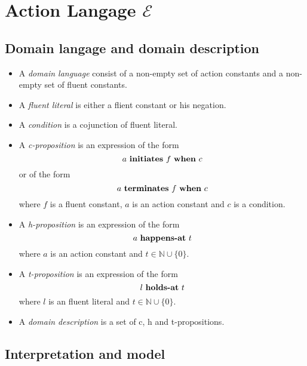 \section{Action Langage $\mathcal{E}$}\label{sec:e}

\theoremstyle{definition}
\newtheorem{definition}{Definition}[section]

\subsection{Domain langage and domain description}

\begin{itemize}
  \item A \emph{domain language} consist of a non-empty set of action constants and a non-empty set of fluent constants.
  \item A \emph{fluent literal} is either a flient constant or his negation.
  \item A \emph{condition} is a cojunction of fluent literal.
  \item A \emph{c-proposition} is an expression of the form
    $$a \text{ \textbf{initiates} } f \text{ \textbf{when} } c$$
    or of the form
    $$a \text{ \textbf{terminates} } f \text{ \textbf{when} } c$$
    where $f$ is a fluent constant, $a$ is an action constant and $c$ is a condition.
  \item A \emph{h-proposition} is an expression of the form
    $$a \text{ \textbf{happens-at} } t$$
    where $a$ is an action constant and $t \in \mathbb{N} \cup \{0\}$.
  \item A \emph{t-proposition} is an expression of the form
    $$l \text{ \textbf{holds-at} } t$$
    where $l$ is an fluent literal and $t \in \mathbb{N} \cup \{0\}$.
  \item A \emph{domain description} is a set of c, h and t-propositions.
\end{itemize}

\subsection{Interpretation and model}

